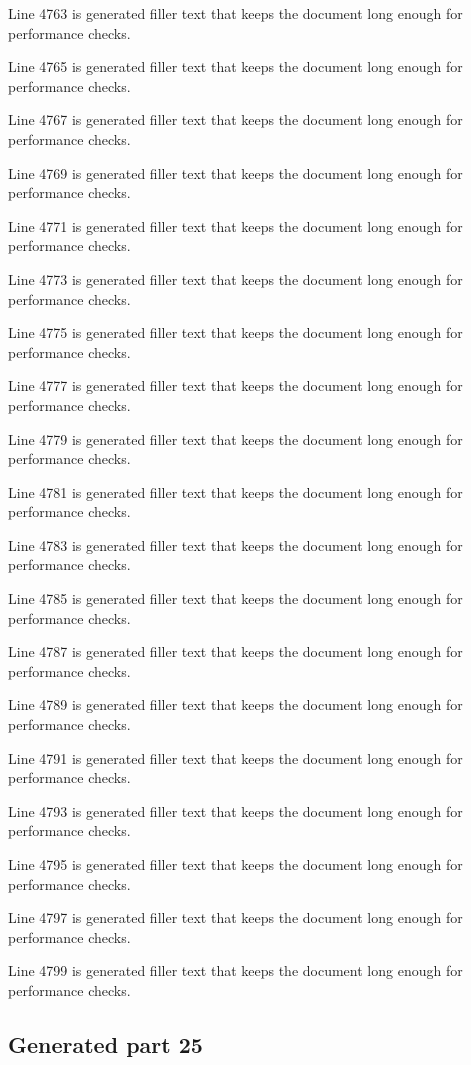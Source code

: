 Line 4763 is generated filler text that keeps the document long enough for performance checks.

Line 4765 is generated filler text that keeps the document long enough for performance checks.

Line 4767 is generated filler text that keeps the document long enough for performance checks.

Line 4769 is generated filler text that keeps the document long enough for performance checks.

Line 4771 is generated filler text that keeps the document long enough for performance checks.

Line 4773 is generated filler text that keeps the document long enough for performance checks.

Line 4775 is generated filler text that keeps the document long enough for performance checks.

Line 4777 is generated filler text that keeps the document long enough for performance checks.

Line 4779 is generated filler text that keeps the document long enough for performance checks.

Line 4781 is generated filler text that keeps the document long enough for performance checks.

Line 4783 is generated filler text that keeps the document long enough for performance checks.

Line 4785 is generated filler text that keeps the document long enough for performance checks.

Line 4787 is generated filler text that keeps the document long enough for performance checks.

Line 4789 is generated filler text that keeps the document long enough for performance checks.

Line 4791 is generated filler text that keeps the document long enough for performance checks.

Line 4793 is generated filler text that keeps the document long enough for performance checks.

Line 4795 is generated filler text that keeps the document long enough for performance checks.

Line 4797 is generated filler text that keeps the document long enough for performance checks.

Line 4799 is generated filler text that keeps the document long enough for performance checks.

\subsection{Generated part 25}


